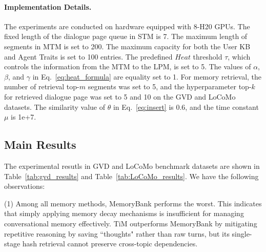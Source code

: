 \documentclass[11pt]{article}
\begin{document}
\paragraph{Implementation Details.}
The experiments are conducted on hardware equipped with 8-H20 GPUs.
The fixed length of the dialogue page queue in STM is 7. 
The maximum length of segments in MTM is set to 200.
The maximum capacity for both the User KB and Agent Traits is set to 100 entries.
The predefined $Heat$ threshold $\tau$, which controls the information from the MTM to the LPM, is set to 5. 
The values of $\alpha$, $\beta$, and $\gamma$ in Eq.~\ref{eq:heat_formula} are equality set to 1. 
For memory retrieval, the number of retrieval top-$m$ segments was set to 5, and the hyperparameter top-$k$ for retrieved dialogue page was set to 5 and 10 on the GVD and LoCoMo datasets. 
The similarity value of $\theta$ in Eq.~\ref{eq:insert} is 0.6, and the time constant $\mu$ is 1e+7.  















\subsection{Main Results}
The experimental resutls in GVD and LoCoMo benchmark datasets are shown in Table~\ref{tab:gvd_results} and Table~\ref{tab:LoCoMo_results}. We have the following observations:



(1) Among all memory methods, MemoryBank performs the worst. This indicates that simply applying memory decay mechanisms is insufficient for managing conversational memory effectively. 
TiM outperforms MemoryBank by mitigating repetitive reasoning by saving ``thoughts" rather than raw turns, but its single-stage hash retrieval cannot preserve cross-topic dependencies. 
\end{document}

